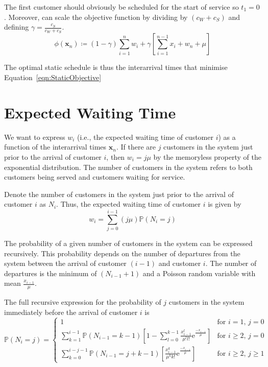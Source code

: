 The first customer should obviously be scheduled for the start of service so $t_{1} = 0$. Moreover, can scale the objective function by dividing by $(c_{W} + c_{S})$ and defining $\gamma = \frac{c_{S}}{c_{W} + c_{S}}$.
\begin{equation}
	\phi (\mathbf{x}_{n}) \coloneqq (1 - \gamma) \sum_{i = 1}^{n} w_{i} + \gamma \left[ \sum_{i = 1}^{n - 1} x_{i} + w_{n} + \mu \right]
	\label{eqn:StaticObjective}
\end{equation}

The optimal static schedule is thus the interarrival times that minimise Equation~\ref{eqn:StaticObjective}

\section{Expected Waiting Time}
We want to express $w_{i}$ (i.e., the expected waiting time of customer $i$) as a function of the interarrival times $\mathbf{x}_{n}$. If there are $j$ customers in the system just prior to the arrival of customer $i$, then $w_{i} = j \mu$ by the memoryless property of the exponential distribution. The number of customers in the system refers to both customers being served and customers waiting for service.

Denote the number of customers in the system just prior to the arrival of customer $i$ as $N_{i}$. Thus, the expected waiting time of customer $i$ is given by
\begin{equation}
	w_{i} = \sum_{j = 0}^{i - 1} (j \mu) \mathbb{P} (N_{i} = j)
	\label{eqn:StaticWaiting}
\end{equation}

The probability of a given number of customers in the system can be expressed recursively. This probability depends on the number of departures from the system between the arrival of customer $(i - 1)$ and customer $i$. The number of departures is the minimum of $(N_{i - 1} + 1)$ and a Poisson random variable with mean $\frac{x_{i - 1}}{\mu}$.

The full recursive expression for the probability of $j$ customers in the system immediately before the arrival of customer $i$ is
\begin{equation}
	\mathbb{P} (N_{i} = j) = \begin{cases} 1 & \text{for $i = 1$, $j = 0$} \\
	\sum_{k = 1}^{i - 1} \mathbb{P} (N_{i - 1} = k - 1) \left[ 1 - \sum_{l = 0}^{k - 1} \frac{x_{i - 1}^{l}}{\mu^{l} l!} \mathrm{e}^{\frac{- x_{i - 1}}{\mu}}\right] & \text{for $i \geq 2$, $j = 0$} \\
	\sum_{k = 0}^{i - j - 1} \mathbb{P} (N_{i - 1} = j + k - 1) \left[ \frac{x_{i - 1}^{k}}{\mu^{k} k!} \mathrm{e}^{\frac{- x_{i - 1}}{\mu}} \right] & \text{for $i \geq 2$, $j \geq 1$} \end{cases}
	\label{eqn:StaticProbSystem}
\end{equation}

